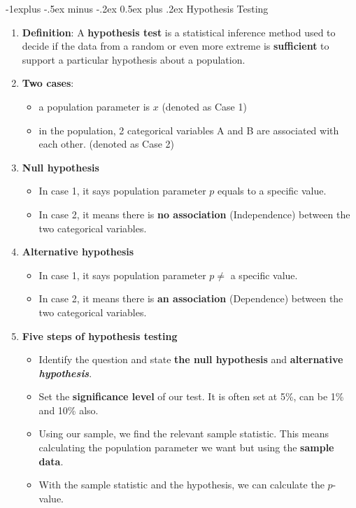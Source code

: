 \documentclass[10pt, landscape]{article}
\makeatletter
\renewcommand{\subsection}{\@startsection{subsection}{2}{0mm}%
                                {-1explus -.5ex minus -.2ex}%
                                {0.5ex plus .2ex}%
                                {\normalfont\normalsize\bfseries}}
\makeatother
\begin{document}
\begin{multicols}{4}
\subsection{Hypothesis Testing}
\begin{enumerate}
    \item \textbf{Definition}: A \textbf{hypothesis test} is a statistical inference method used to decide if the data from a random or even more extreme is \textbf{sufficient} to support a particular hypothesis about a population.
    \item \textbf{Two cases}:
    \begin{itemize}
        \item a population parameter is $x$ (denoted as Case 1)
        \item in the population, 2 categorical variables A and B are associated with each other. (denoted as Case 2)
    \end{itemize}
    \item \textbf{Null hypothesis}
    \begin{itemize}
       \item In case 1, it says population parameter $p$ equals to a specific value.
       \item In case 2, it means there is \textbf{no association} (Independence) between the two categorical variables.
    \end{itemize}
    \item \textbf{Alternative hypothesis}
    \begin{itemize}
        \item In case 1, it says population parameter $p \neq$ a specific value.
        \item In case 2, it means there is \textbf{an association} (Dependence) between the two categorical variables.
    \end{itemize}
    \item \textbf{Five steps of hypothesis testing}
    \begin{itemize}
        \item Identify the question and state \textbf{the null hypothesis} and \textbf{alternative\textit{ hypothesis}}.
        \item Set the \textbf{significance level} of our test. It is often set at 5\%, can be 1\% and 10\% also.
        \item Using our sample, we find the relevant sample statistic. This means calculating the population parameter we want but using the \textbf{sample data}.
        \item With the sample statistic and the hypothesis, we can calculate the $p$-value.

\end{itemize}
\end{enumerate}
\end{multicols}
\end{document}
